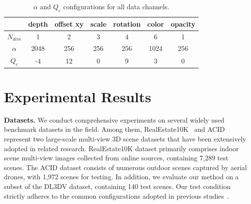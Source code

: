 \documentclass[lettersize,journal]{IEEEtran}
\begin{document}
\begin{table}[t]
  \centering
  \caption{$\alpha$ and $Q_{c}$ configurations for all data channels.}
    \begin{tabular}{ccccccc}
    \toprule
          & depth & offset xy & scale & rotation & color & opacity \\
    \midrule
    $N_{dim}$ & 1     & 2     & 3     & 4     & 6     & 1 \\
    \midrule
    $\alpha$ & 2048  & 256   & 256   & 256   & 1024  & 256 \\
    \midrule
    $Q_{c}$ & -4    & 12    & 0     & 9     & 3     & 0 \\
    \bottomrule
    \end{tabular}%
  \label{tab:qstep cfg}%
\end{table}%

\section{Experimental Results}
\label{sec:experiment}
\textbf{Datasets.} 
We conduct comprehensive experiments on several widely used benchmark datasets in the field. Among them, RealEstate10K~\cite{zhou2018stereo} and ACID~\cite{liu2021infinite} represent two large-scale multi-view 3D scene datasets that have been extensively adopted in related research. RealEstate10K dataset primarily comprises indoor scene multi-view images collected from online sources, containing 7,289 test scenes. The ACID dataset consists of numerous outdoor scenes captured by aerial drones, with 1,972 scenes for testing. In addition, we evaluate our method on a subset of the DL3DV dataset, containing 140 test scenes. Our test condition strictly adheres to the common configurations adopted in previous studies~\cite{pixelsplat, mvsplat, xu2024depthsplat}.

\end{document}

